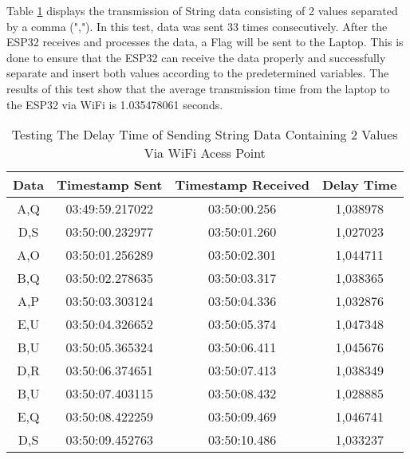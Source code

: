 Table \ref{tbl:delayWiFi2} displays the transmission of String data consisting of 2 values separated by a comma (","). In this test, data was sent 33 times consecutively. After the ESP32 receives and processes the data, a Flag will be sent to the Laptop. This is done to ensure that the ESP32 can receive the data properly and successfully separate and insert both values according to the predetermined variables. The results of this test show that the average transmission time from the laptop to the ESP32 via WiFi is 1.035478061 seconds.

\begin{table}[!ht]
  \centering
  \caption{Testing The Delay Time of Sending String Data Containing 2 Values Via WiFi Acess Point}
  \label{tbl:delayWiFi2}
  \begin{tabular}{|ccc|c|}
  \hline
  \multicolumn{1}{|c|}{Data} & \multicolumn{1}{c|}{Timestamp Sent}  & Timestamp Received & Delay Time  \\ \hline
  \multicolumn{1}{|c|}{A,Q}  & \multicolumn{1}{c|}{03:49:59.217022} & 03:50:00.256       & 1,038978    \\ \hline
  \multicolumn{1}{|c|}{D,S}  & \multicolumn{1}{c|}{03:50:00.232977} & 03:50:01.260       & 1,027023    \\ \hline
  \multicolumn{1}{|c|}{A,O}  & \multicolumn{1}{c|}{03:50:01.256289} & 03:50:02.301       & 1,044711    \\ \hline
  \multicolumn{1}{|c|}{B,Q}  & \multicolumn{1}{c|}{03:50:02.278635} & 03:50:03.317       & 1,038365    \\ \hline
  \multicolumn{1}{|c|}{A,P}  & \multicolumn{1}{c|}{03:50:03.303124} & 03:50:04.336       & 1,032876    \\ \hline
  \multicolumn{1}{|c|}{E,U}  & \multicolumn{1}{c|}{03:50:04.326652} & 03:50:05.374       & 1,047348    \\ \hline
  \multicolumn{1}{|c|}{B,U}  & \multicolumn{1}{c|}{03:50:05.365324} & 03:50:06.411       & 1,045676    \\ \hline
  \multicolumn{1}{|c|}{D,R}  & \multicolumn{1}{c|}{03:50:06.374651} & 03:50:07.413       & 1,038349    \\ \hline
  \multicolumn{1}{|c|}{B,U}  & \multicolumn{1}{c|}{03:50:07.403115} & 03:50:08.432       & 1,028885    \\ \hline
  \multicolumn{1}{|c|}{E,Q}  & \multicolumn{1}{c|}{03:50:08.422259} & 03:50:09.469       & 1,046741    \\ \hline
  \multicolumn{1}{|c|}{D,S}  & \multicolumn{1}{c|}{03:50:09.452763} & 03:50:10.486       & 1,033237    \\ \hline

\end{tabular}
\end{table}
